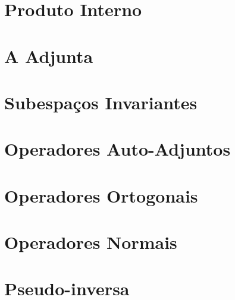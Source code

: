 \documentclass[12pt]{article}
\theoremstyle{plain}
\theoremstyle{definition}
\theoremstyle{remark}
\begin{document}
\section{Produto Interno}
\section{A Adjunta}
\section{Subespaços Invariantes}
\section{Operadores Auto-Adjuntos}
\section{Operadores Ortogonais}
\section{Operadores Normais}
\section{Pseudo-inversa}
\end{document}
